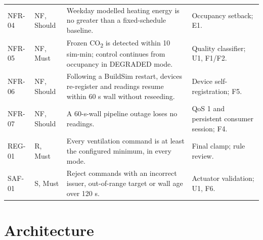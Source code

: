\documentclass[11pt,a4paper]{article}
\begin{document}
{\begin{longtable}{>{\raggedright\arraybackslash}p{15mm}>{\raggedright\arraybackslash}p{13mm}>{\raggedright\arraybackslash}p{77mm}>{\raggedright\arraybackslash}p{37mm}}
NFR-04 & NF, Should & Weekday modelled heating energy is no greater than a fixed-schedule baseline. & Occupancy setback; E1.\\
NFR-05 & NF, Must & Frozen CO\textsubscript{2} is detected within 10 sim-min; control continues from occupancy in DEGRADED mode. & Quality classifier; U1, F1/F2.\\
NFR-06 & NF, Should & Following a BuildSim restart, devices re-register and readings resume within 60 s wall without reseeding. & Device self-registration; F5.\\
NFR-07 & NF, Should & A 60-s-wall pipeline outage loses no readings. & QoS 1 and persistent consumer session; F4.\\
REG-01 & R, Must & Every ventilation command is at least the configured minimum, in every mode. & Final clamp; rule review.\\
SAF-01 & S, Must & Reject commands with an incorrect issuer, out-of-range target or wall age over 120 s. & Actuator validation; U1, F6.\\\bottomrule
\end{longtable}}

\section{Architecture}
\end{document}
